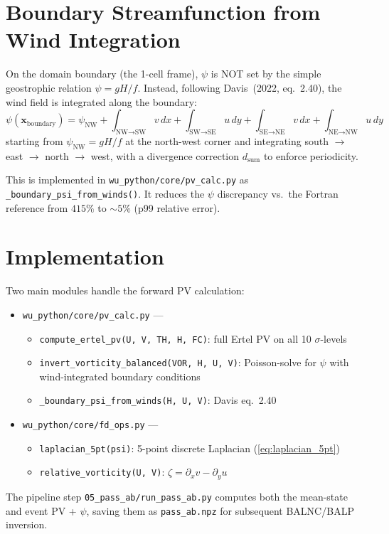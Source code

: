\section{Boundary Streamfunction from Wind Integration}

On the domain boundary (the 1-cell frame), $\psi$ is NOT set by the simple
geostrophic relation $\psi = gH/f$.  Instead, following Davis~(2022, eq.~2.40),
the wind field is integrated along the boundary:
\begin{equation}
  \psi(\mathbf{x}_\text{boundary}) = \psi_\text{NW}
  + \int_{\text{NW}\to\text{SW}} v\,dx
  + \int_{\text{SW}\to\text{SE}} u\,dy
  + \int_{\text{SE}\to\text{NE}} v\,dx
  + \int_{\text{NE}\to\text{NW}} u\,dy
  \label{eq:psi_boundary}
\end{equation}
starting from $\psi_\text{NW} = gH/f$ at the north-west corner and
integrating south $\to$ east $\to$ north $\to$ west, with a divergence
correction $d_\text{sum}$ to enforce periodicity.

This is implemented in \texttt{wu\_python/core/pv\_calc.py} as
\texttt{\_boundary\_psi\_from\_winds()}.  It reduces the $\psi$ discrepancy
vs.~the Fortran reference from $415\%$ to $\sim5\%$ (p99 relative error).

\section{Implementation}

Two main modules handle the forward PV calculation:

\begin{itemize}
  \item \texttt{wu\_python/core/pv\_calc.py} ---
        \begin{itemize}
          \item \texttt{compute\_ertel\_pv(U, V, TH, H, FC)}: full Ertel PV on
                all 10 $\sigma$-levels
          \item \texttt{invert\_vorticity\_balanced(VOR, H, U, V)}: Poisson-solve
                for $\psi$ with wind-integrated boundary conditions
          \item \texttt{\_boundary\_psi\_from\_winds(H, U, V)}: Davis eq.~2.40
        \end{itemize}
  \item \texttt{wu\_python/core/fd\_ops.py} ---
        \begin{itemize}
          \item \texttt{laplacian\_5pt(psi)}: 5-point discrete Laplacian
                (\ref{eq:laplacian_5pt})
          \item \texttt{relative\_vorticity(U, V)}: $\zeta = \partial_x v - \partial_y u$
        \end{itemize}
\end{itemize}

The pipeline step \texttt{05\_pass\_ab/run\_pass\_ab.py} computes both the
mean-state and event PV + $\psi$, saving them as \texttt{pass\_ab.npz} for
subsequent BALNC/BALP inversion.
